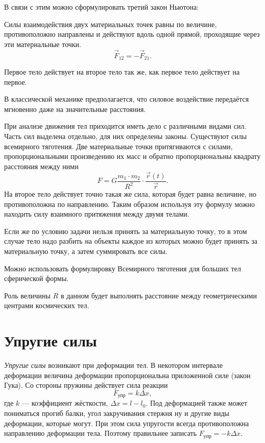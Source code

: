 В связи с этим можно сформулировать третий закон Ньютона:
\begin{theorem}\label{thrm:third-nuton}
	Силы взаимодействия двух материальных точек равны по величине, противоположно
	направлены и действуют вдоль одной прямой, проходящие через эти материальные
	точки.\[
		\vec{F}_{12} = - \vec{F}_{21}
		.\]
\end{theorem}

Первое тело действует на второе тело так же, как первое тело действует на
первое.

\begin{corollary}
	В классической механике предполагается, что силовое воздействие передаётся
	мгновенно даже на значительные расстояния.
\end{corollary}

При анализе движения тел приходится иметь дело с различными видами сил. Часть
сил выделена отдельно, для них определены законы. Существуют силы всемирного
тяготения. Две материальные точки притягиваются с силами, пропорциональными
произведению их масс и обратно пропорциональны квадрату расстояния между ними
\[
	F = G \frac{m_1 \cdot m_2}{R^2} \cdot \frac{\vec{r}(t)}{\vec{r}}
	.\] На второе тело действует точно такая же сила, которая будет равна
величине, но противоположна по направлению. Таким образом используя эту
формулу можно находить силу взаимного притяжения между двумя телами.

Если же по условию задачи нельзя принять за материальную точку, то в этом
случае тело надо разбить на объекты каждое из которых можно будет принять за
материальную точку, а затем суммировать все силы.

Можно использовать формулировку Всемирного тяготения для больших тел
сферической формы.

Роль величины \( R \) в данном будет выполнять расстояние между геометрическими
центрами космических тел.

\section{Упругие силы}%

\emph{Упругие силы} возникают при деформации тел. В некотором интервале
деформации величина деформации пропорциональна приложенной силе (закон Гука).
Со стороны пружины действует сила реакции \[
	F_\text{упр} = k \Delta x
	,\] где \( k \) --- коэффициент жёсткости, \( \Delta x = l - l_0 \). Под
деформацией также может пониматься прогиб балки, угол закручивания стержня ну
и другие виды деформации, которые могут. При этом сила упругости всегда
противоположна направлению деформации тела. Поэтому правильнее записать \(
F_\text{упр} = - k \Delta x \).

